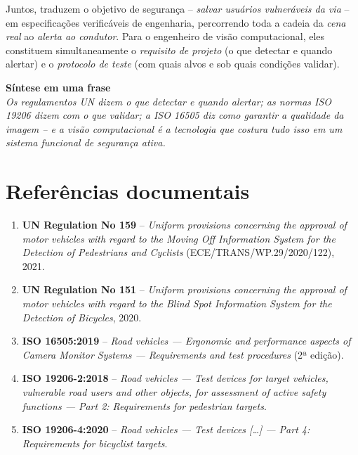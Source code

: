 \documentclass[11pt,a4paper]{article}
\newcommand{\destaque}[2]{%
  \begin{center}
  \begin{minipage}{0.96\linewidth}
  \colorbox{azulclaro}{\parbox{\dimexpr\linewidth-2\fboxsep}{%
  \textbf{\textcolor{azulun}{#1}}\\[2pt]\small #2}}
  \end{minipage}
  \end{center}}
\begin{document}
Juntos, traduzem o objetivo de segurança -- \emph{salvar usuários vulneráveis
da via} -- em especificações verificáveis de engenharia, percorrendo toda a
cadeia da \emph{cena real} ao \emph{alerta ao condutor}. Para o engenheiro de
visão computacional, eles constituem simultaneamente o \emph{requisito de
projeto} (o que detectar e quando alertar) e o \emph{protocolo de teste} (com
quais alvos e sob quais condições validar).

\vspace{0.5cm}
\destaque{Síntese em uma frase}{\emph{Os regulamentos UN dizem o que detectar e
quando alertar; as normas ISO 19206 dizem com o que validar; a ISO 16505 diz
como garantir a qualidade da imagem -- e a visão computacional é a tecnologia
que costura tudo isso em um sistema funcional de segurança ativa.}}

\section*{Referências documentais}
\small
\begin{enumerate}[leftmargin=1.5em,itemsep=2pt]
  \item \textbf{UN Regulation No 159} -- \emph{Uniform provisions concerning the
        approval of motor vehicles with regard to the Moving Off Information
        System for the Detection of Pedestrians and Cyclists}
        (ECE/TRANS/WP.29/2020/122), 2021.
  \item \textbf{UN Regulation No 151} -- \emph{Uniform provisions concerning the
        approval of motor vehicles with regard to the Blind Spot Information
        System for the Detection of Bicycles}, 2020.
  \item \textbf{ISO 16505:2019} -- \emph{Road vehicles --- Ergonomic and
        performance aspects of Camera Monitor Systems --- Requirements and test
        procedures} (2ª edição).
  \item \textbf{ISO 19206-2:2018} -- \emph{Road vehicles --- Test devices for
        target vehicles, vulnerable road users and other objects, for assessment
        of active safety functions --- Part 2: Requirements for pedestrian targets}.
  \item \textbf{ISO 19206-4:2020} -- \emph{Road vehicles --- Test devices [\ldots]
        --- Part 4: Requirements for bicyclist targets}.
\end{enumerate}
\end{document}
